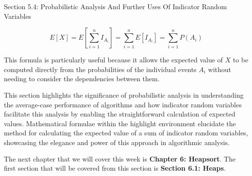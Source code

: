 \begin{notes}{Section 5.4: Probabilistic Analysis And Further Uses Of Indicator Random Variables}
\begin{highlight}
        \begin{equation*}
            E[X] = E\left[\sum_{i=1}^{n} I_{A_i}\right] = \sum_{i=1}^{n} E[I_{A_i}] = \sum_{i=1}^{n} P(A_i)
        \end{equation*}
    
        This formula is particularly useful because it allows the expected value of $X$ to be computed directly from the probabilities of the individual events $A_i$ without needing to consider the 
        dependencies between them.
    \end{highlight}
    
    This section highlights the significance of probabilistic analysis in understanding the average-case performance of algorithms and how indicator random variables facilitate this analysis by enabling 
    the straightforward calculation of expected values. Mathematical formulae within the highlight environment elucidate the method for calculating the expected value of a sum of indicator random 
    variables, showcasing the elegance and power of this approach in algorithmic analysis.
\end{notes}

The next chapter that we will cover this week is \textbf{Chapter 6: Heapsort}. The first section that will be covered from this section is \textbf{Section 6.1: Heaps}.

